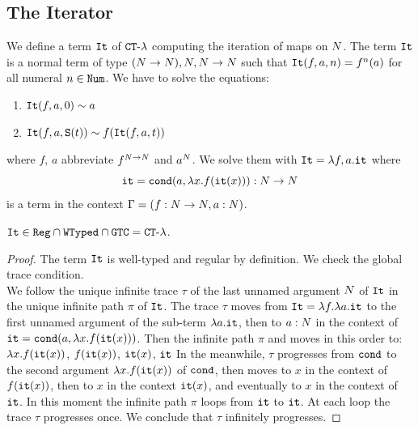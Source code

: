 
\subsection{The Iterator}

\begin{Eg}
We define a term ${\tt It}$ of  ${ {\tt CT}\mbox{-}\lambda}$ computing the iteration of maps on ${N}$.
The term ${\tt It}$ is a normal term of type $({N} \rightarrow {N}), {N},{N} \rightarrow {N}$ such that
${\tt It}(f,a,n)=f^n(a)$ for all numeral $n \in {\tt Num}$. 
We have to solve the equations:

\begin{enumerate}
\item
${\tt It}(f,a,0) \sim a$ 
\item
${\tt It}(f,a,{\tt S} (t)) \sim f({\tt It}(f,a,t))$
\end{enumerate}

where $f$, $a$ abbreviate $f^{{N}\rightarrow{N}}$ and $a^{N}$.
We solve them with ${\tt It} = \lambda f, a.{\tt it}$
where 
$$
{\tt it} = {\tt cond} (a, \lambda x.f({\tt it}(x))):{N} \rightarrow {N}
$$ 
is a term in the context $\Gamma = (f:{N} \rightarrow {N}, a:{N})$.
\end{Eg}

\begin{proposition}
${\tt It} \in {\tt Reg} \cap {\tt WTyped} \cap {\tt GTC} = { {\tt CT}\mbox{-}\lambda}$.
\end{proposition}

\begin{proof}
The term ${\tt It}$ is well-typed and regular by definition. 
We check the global trace condition. 
\\
We follow the unique infinite trace $\tau$ of the last unnamed argument ${N}$ of ${\tt It}$ 
in the unique infinite path $\pi$ of ${\tt It}$. 
The trace $\tau$ moves from  ${\tt It} = \lambda f. \lambda a.{\tt it}$
 to the first unnamed argument of the sub-term $\lambda a.{\tt it}$, 
then to $a:{N}$ in the context of ${\tt it} = {\tt cond} (a, \lambda x.f({\tt it}(x)))$.
Then the infinite path $\pi$ and moves in this order to:
 $\lambda x.f({\tt it}(x))$, $f({\tt it}(x))$, $ {\tt it}(x)$, ${\tt it}$
In the meanwhile, $\tau$ progresses from ${\tt cond}$ to the second argument $\lambda x.f({\tt it}(x))$
of ${\tt cond}$, then moves to $x$ in the context of $f({\tt it}(x))$,
then to $x$ in the context ${\tt it}(x)$, and eventually to $x$ in the context of ${\tt it}$.
In this moment the infinite path $\pi$ loops from ${\tt it}$ to ${\tt it}$. At each loop the trace $\tau$ 
progresses once. We conclude that $\tau$ infinitely progresses.
\end{proof}

